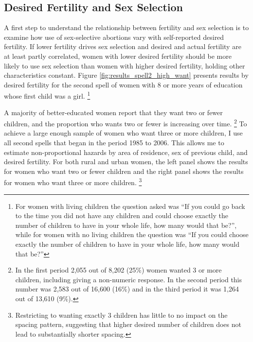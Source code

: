 \documentclass[12pt,letterpaper]{article}
\begin{document}
\subsection{Desired Fertility and Sex Selection}

A first step to understand the relationship between fertility and sex selection
is to examine how use of sex-selective abortions vary with self-reported desired 
fertility.
If lower fertility drives sex selection and desired and actual fertility are
at least partly correlated, women with lower desired fertility should be more 
likely to use sex selection than women with higher desired fertility, 
holding other characteristics constant.
Figure \ref{fig:results_spell2_high_want} presents results by desired fertility 
for the second spell of women with 8 or more years of education whose first child was a 
girl.%
\footnote{
For women with living children the question asked was
``If you could go back to the time you did not have any children and could choose exactly 
the number of children to have in your whole life, how many would that be?'', while
for women with no living children the question was
``If you could choose exactly the number of children to have in your whole life, how many 
would that be?''
}

A majority of better-educated women report that they want two or fewer 
children, and the proportion who wants two or fewer is increasing over time.%
\footnote{
In the first period 2,055 out of 8,202 (25\%) women wanted 3 or more 
children, including giving a non-numeric response.
In the second period this number was 2,583 out of 16,600 (16\%) 
and in the third period it was 1,264 out of 13,610 (9\%).
} 
To achieve a large enough sample of women who want three or more children, I use all 
second spells that began in the period 1985 to 2006.
This allows me to estimate non-proportional hazards by area of residence, sex of 
previous child, and desired fertility.
For both rural and urban women, the left panel shows the results for women who want two 
or fewer children and the right panel shows the results for women who 
want three or more children.%
\footnote{
Restricting to wanting exactly 3 children has little to no impact on the spacing
pattern, suggesting that higher desired number of children does not lead to
substantially shorter spacing.
}
\end{document}
